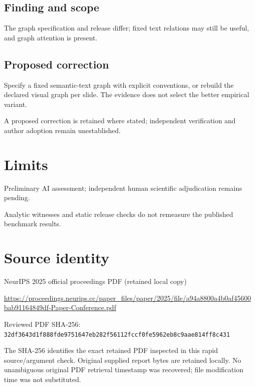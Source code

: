 \documentclass[11pt]{article}
\begin{document}
\subsection*{Finding and scope}

The graph specification and release differ; fixed text relations may still be useful, and graph attention is present.

\subsection*{Proposed correction}

Specify a fixed semantic-text graph with explicit conventions, or rebuild the declared visual graph per slide. The evidence does not select the better empirical variant.

A proposed correction is retained where stated; independent verification and author adoption remain unestablished.

\section*{Limits}

Preliminary AI assessment; independent human scientific adjudication remains pending.\par

Analytic witnesses and static release checks do not remeasure the published benchmark results.\par

\section*{Source identity}

NeurIPS 2025 official proceedings PDF (retained local copy)

\url{https://proceedings.neurips.cc/paper_files/paper/2025/file/a94a8800a4b0af45600bab91164849df-Paper-Conference.pdf}

Reviewed PDF SHA-256: \nolinkurl{32df3643d1f888fde9751647eb282f56112fccf0fe5962eb8c9aae814ff8c431}

The SHA-256 identifies the exact retained PDF inspected in this rapid source/argument check. Original supplied report bytes are retained locally. No unambiguous original PDF retrieval timestamp was recovered; file modification time was not substituted.
\end{document}
